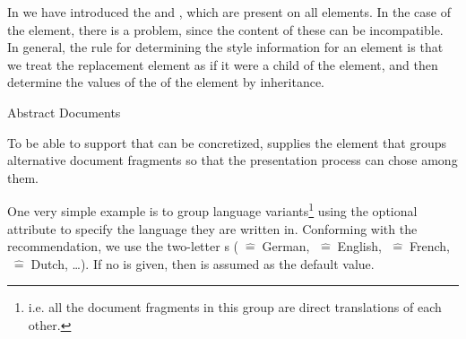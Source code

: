 \begin{omgroup}[id=omdoc-infrastructure,short=Document Infrastructure]
\begin{module}[id=sharing]
\begin{omgroup}[id=sharing,short=Sharing Document Parts]
In {} we have introduced the {\css}
  and ,
which are present on all \omdoc elements. In the case of the  element,
there is a problem, since the content of these can be incompatible. In general, the rule
for determining the style information for an element is that we treat the replacement
element as if it were a child of the  element, and then determine the
values of the {\css}  of the  element by
inheritance.
\end{omgroup}
\end{module}

\begin{module}[id=docalt]
\begin{omgroup}{Abstract Documents}

\begin{definition}[id=docalt.def]
  To be able to support {} that can be concretized, \omdoc
  supplies the {} element that groups alternative document fragments so that the
  presentation process can chose among them.
 \end{definition}

\begin{example}
  One very simple example is to group language variants\footnote{i.e. all the document
    fragments in this group are direct translations of each other.} using the optional
  {} attribute to specify the language they are written
  in. Conforming with the {\xml} recommendation, we use the  two-letter {s}
  ({}$\;\widehat=\;$German, {}$\;\widehat=\;$English,
  {}$\;\widehat=\;$French, {}$\;\widehat=\;$Dutch, \ldots). If
  no {} is given, then {} is
  assumed as the default value. 


\end{example}
\end{omgroup}
\end{module}
\end{omgroup}

